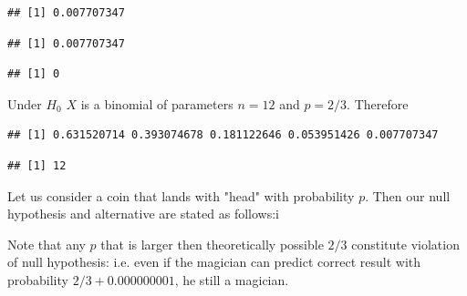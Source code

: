 \begin{ExerciseList}
\begin{knitrout}
\color{fgcolor}\begin{kframe}
\begin{alltt}
\hldef{(}\hldef{,}  \hldef{=} \hldef{,}  \hldef{=} \hlopt{/}\hldef{,}  
\end{alltt}
\begin{verbatim}
## [1] 0.007707347
\end{verbatim}
\begin{alltt}
\hldef{(}\hlopt{/}\hldef{)}\hlopt{^}\hldef{\{}\hldef{\}}
\end{alltt}
\begin{verbatim}
## [1] 0.007707347
\end{verbatim}
\begin{alltt}
\end{alltt}
\begin{verbatim}
## [1] 0
\end{verbatim}
\end{kframe}
\end{knitrout}
	\Answer 	
	Under $H_0$ $X$ is a binomial of parameters $n = 12$ and $p = 2/3$. Therefore  
\begin{knitrout}
\color{fgcolor}\begin{kframe}
\begin{alltt}
 \hlkwb{<-} 
 \hlkwb{<-} \hlopt{/}
\hldef{(}\hlopt{:}\hldef{,}       
\end{alltt}
\begin{verbatim}
## [1] 0.631520714 0.393074678 0.181122646 0.053951426 0.007707347
\end{verbatim}
\begin{alltt}
\hldef{(}\hldef{,}      \hlopt{+} 
\end{alltt}
\begin{verbatim}
## [1] 12
\end{verbatim}
\end{kframe}
\end{knitrout}
	\Answer	Let us consider a coin that lands with "head" with probability $p$. Then our null hypothesis and alternative are stated as follows:i
	
		Note that any $p$ that is larger then theoretically possible $2/3$ constitute violation of null hypothesis: i.e. even if the magician can predict correct result with probability $2/3 + 0.000000001$, he still a magician.
	\end{ExerciseList}
